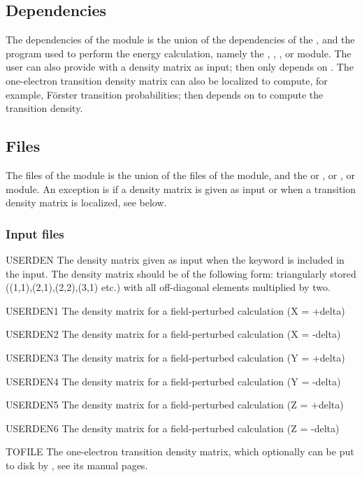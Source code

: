 \subsection{Dependencies}
\label{UG:sec:LoProp_dependencies}
The dependencies of the  module is the union
of the dependencies of the , and
the program used to perform the energy calculation, namely
the , ,
 , or  module. The user
can also provide  with a density matrix as input; then
 only depends on . The one-electron
transition density matrix can also be localized to compute, for
example, F{\"o}rster transition probabilities; then 
depends on  to compute the transition density.

\subsection{Files}
\label{UG:sec:LoProp_files}
The files of the  module is the union
of the files of the  module,
and the  or ,
or , or  module.
An exception is if a density matrix is given as input or
when a transition density matrix is localized, see below.

\subsubsection{Input files}
\begin{filelist}
\item[USERDEN]
The density matrix given as input when the keyword  is
included in the input. The density matrix should be of the following
form: triangularly stored ((1,1),(2,1),(2,2),(3,1) etc.) with
all off-diagonal elements multiplied by two.
\item[USERDEN1]
The density matrix for a field-perturbed calculation (X = +delta)
\item[USERDEN2]
The density matrix for a field-perturbed calculation (X = -delta)
\item[USERDEN3]
The density matrix for a field-perturbed calculation (Y = +delta)
\item[USERDEN4]
The density matrix for a field-perturbed calculation (Y = -delta)
\item[USERDEN5]
The density matrix for a field-perturbed calculation (Z = +delta)
\item[USERDEN6]
The density matrix for a field-perturbed calculation (Z = -delta)
\item[TOFILE]
The one-electron transition density matrix, which optionally can be
put to disk by , see its manual pages.
\end{filelist}

